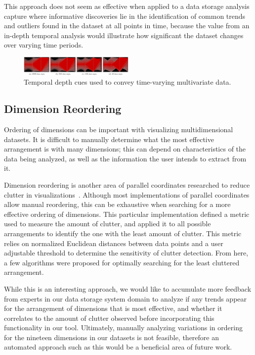 \documentclass[journal]{vgtc}                %
\begin{document}
This approach does not seem as effective when applied to a data storage analysis capture where informative discoveries lie in the identification of common trends and outliers found in the dataset at all points in time, because the value from an in-depth temporal analysis would illustrate how significant the dataset changes over varying time periods.

\begin{figure}[h!]
 \centering
 \includegraphics[width=0.5\textwidth]{images/temporal_depth.eps}
 \caption{Temporal depth cues used to convey time-varying multivariate data.}
 \label{fig:temporal_depth}
\end{figure}

\subsection{Dimension Reordering}
\label{dimensional_reordering}
Ordering of dimensions can be important with visualizing multidimensional datasets. It is difficult to manually determine what the most effective arrangement is with many dimensions; this can depend on characteristics of the data being analyzed, as well as the information the user intends to extract from it.

Dimension reordering is another area of parallel coordinates researched to reduce clutter in visualizations~\cite{peng:2005:CRMD}. Although most implementations of parallel coordinates allow manual reordering, this can be exhaustive when searching for a more effective ordering of dimensions. This particular implementation defined a metric used to measure the amount of clutter, and applied it to all possible arrangements to identify the one with the least amount of clutter. This metric relies on normalized Euclidean distances between data points and a user adjustable threshold to determine the sensitivity of clutter detection. From here, a few algorithms were proposed for optimally searching for the least cluttered arrangement. 

While this is an interesting approach, we would like to accumulate more feedback from experts in our data storage system domain to analyze if any trends appear for the arrangement of dimensions that is most effective, and whether it correlates to the amount of clutter observed before incorporating this functionality in our tool. Ultimately, manually analyzing variations in ordering for the nineteen dimensions in our datasets is not feasible, therefore an automated approach such as this would be a beneficial area of future work.
\end{document}
